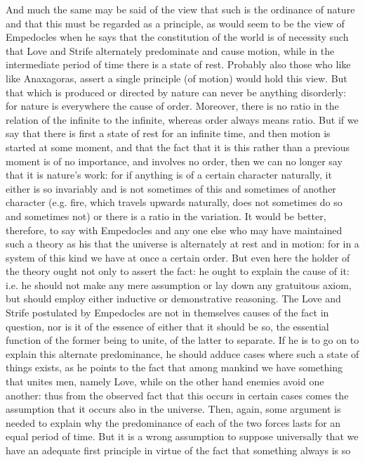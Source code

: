 And much the same may be said of the view that such is the ordinance
of nature and that this must be regarded as a principle, as would
seem to be the view of Empedocles when he says that the constitution
of the world is of necessity such that Love and Strife alternately
predominate and cause motion, while in the intermediate period of
time there is a state of rest. Probably also those who like like Anaxagoras,
assert a single principle (of motion) would hold this view. But that
which is produced or directed by nature can never be anything disorderly:
for nature is everywhere the cause of order. Moreover, there is no
ratio in the relation of the infinite to the infinite, whereas order
always means ratio. But if we say that there is first a state of rest
for an infinite time, and then motion is started at some moment, and
that the fact that it is this rather than a previous moment is of
no importance, and involves no order, then we can no longer say that
it is nature's work: for if anything is of a certain character naturally,
it either is so invariably and is not sometimes of this and sometimes
of another character (e.g. fire, which travels upwards naturally,
does not sometimes do so and sometimes not) or there is a ratio in
the variation. It would be better, therefore, to say with Empedocles
and any one else who may have maintained such a theory as his that
the universe is alternately at rest and in motion: for in a system
of this kind we have at once a certain order. But even here the holder
of the theory ought not only to assert the fact: he ought to explain
the cause of it: i.e. he should not make any mere assumption or lay
down any gratuitous axiom, but should employ either inductive or demonstrative
reasoning. The Love and Strife postulated by Empedocles are not in
themselves causes of the fact in question, nor is it of the essence
of either that it should be so, the essential function of the former
being to unite, of the latter to separate. If he is to go on to explain
this alternate predominance, he should adduce cases where such a state
of things exists, as he points to the fact that among mankind we have
something that unites men, namely Love, while on the other hand enemies
avoid one another: thus from the observed fact that this occurs in
certain cases comes the assumption that it occurs also in the universe.
Then, again, some argument is needed to explain why the predominance
of each of the two forces lasts for an equal period of time. But it
is a wrong assumption to suppose universally that we have an adequate
first principle in virtue of the fact that something always is so
